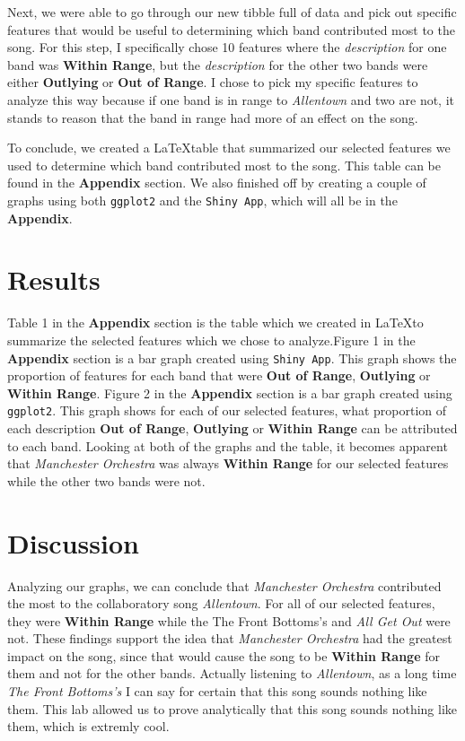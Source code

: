 \documentclass{article}\usepackage[]{graphicx}\usepackage[]{xcolor}
\begin{document}
\begin{multicols}{2}
Next, we were able to go through our new tibble full of data and pick out specific features that would be useful to determining which band contributed most to the song. For this step, I specifically chose 10 features where the \textit{description} for one band was \textbf{Within Range}, but the \textit{description} for the other two bands were either \textbf{Outlying} or \textbf{Out of Range}. I chose to pick my specific features to analyze this way because if one band is in range to \textit{Allentown} and two are not, it stands to reason that the band in range had more of an effect on the song.
\par\indent
To conclude, we created a \LaTeX table that summarized our selected features we used to determine which band contributed most to the song. This table can be found in the \textbf{Appendix} section. We also finished off by creating a couple of graphs using both \texttt{ggplot2} and the \texttt{Shiny App}, which will all be in the \textbf{Appendix}.

\section{Results}
Table 1 in the \textbf{Appendix} section is the table which we created in \LaTeX to summarize the selected features which we chose to analyze.Figure 1 in the \textbf{Appendix} section is a bar graph created using \texttt{Shiny App}. This graph shows the proportion of features for each band that were \textbf{Out of Range}, \textbf{Outlying} or \textbf{Within Range}. Figure 2 in the \textbf{Appendix} section is a bar graph created using \texttt{ggplot2}. This graph shows for each of our selected features, what proportion of each description  \textbf{Out of Range}, \textbf{Outlying} or \textbf{Within Range} can be attributed to each band. Looking at both of the graphs and the table, it becomes apparent that \textit{Manchester Orchestra} was always \textbf{Within Range} for our selected features while the other two bands were not.


\section{Discussion}
Analyzing our graphs, we can conclude that \textit{Manchester Orchestra} contributed the most to the collaboratory song \textit{Allentown}. For all of our selected features, they were \textbf{Within Range} while the {The Front Bottoms's} and \textit{All Get Out} were not. These findings support the idea that \textit{Manchester Orchestra} had the greatest impact on the song, since that would cause the song to be \textbf{Within Range} for them and not for the other bands. Actually listening to \textit{Allentown}, as a long time \textit{The Front Bottoms's} I can say for certain that this song sounds nothing like them. This lab allowed us to prove analytically that this song sounds nothing like them, which is extremly cool.


\end{multicols}
\end{document}
